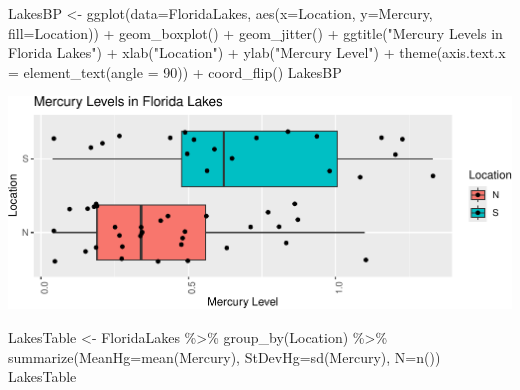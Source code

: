 \documentclass[
  letterpaper,
  DIV=11,
  numbers=noendperiod]{scrreprt}
\newenvironment{Shaded}{\begin{snugshade}}{\end{snugshade}}
\newcommand{\AttributeTok}[1]{\textcolor[rgb]{0.40,0.45,0.13}{#1}}
\newcommand{\DecValTok}[1]{\textcolor[rgb]{0.68,0.00,0.00}{#1}}
\newcommand{\FunctionTok}[1]{\textcolor[rgb]{0.28,0.35,0.67}{#1}}
\newcommand{\NormalTok}[1]{\textcolor[rgb]{0.00,0.23,0.31}{#1}}
\newcommand{\OtherTok}[1]{\textcolor[rgb]{0.00,0.23,0.31}{#1}}
\newcommand{\SpecialCharTok}[1]{\textcolor[rgb]{0.37,0.37,0.37}{#1}}
\newcommand{\StringTok}[1]{\textcolor[rgb]{0.13,0.47,0.30}{#1}}
\begin{document}
\begin{Shaded}
\begin{Highlighting}[]
\NormalTok{LakesBP }\OtherTok{\textless{}{-}} \FunctionTok{ggplot}\NormalTok{(}\AttributeTok{data=}\NormalTok{FloridaLakes, }\FunctionTok{aes}\NormalTok{(}\AttributeTok{x=}\NormalTok{Location, }\AttributeTok{y=}\NormalTok{Mercury, }\AttributeTok{fill=}\NormalTok{Location)) }\SpecialCharTok{+} 
  \FunctionTok{geom\_boxplot}\NormalTok{() }\SpecialCharTok{+}   \FunctionTok{geom\_jitter}\NormalTok{() }\SpecialCharTok{+} \FunctionTok{ggtitle}\NormalTok{(}\StringTok{"Mercury Levels in Florida Lakes"}\NormalTok{) }\SpecialCharTok{+} 
  \FunctionTok{xlab}\NormalTok{(}\StringTok{"Location"}\NormalTok{) }\SpecialCharTok{+} \FunctionTok{ylab}\NormalTok{(}\StringTok{"Mercury Level"}\NormalTok{) }\SpecialCharTok{+} \FunctionTok{theme}\NormalTok{(}\AttributeTok{axis.text.x =} \FunctionTok{element\_text}\NormalTok{(}\AttributeTok{angle =} \DecValTok{90}\NormalTok{)) }\SpecialCharTok{+} \FunctionTok{coord\_flip}\NormalTok{()}
\NormalTok{LakesBP}
\end{Highlighting}
\end{Shaded}

\includegraphics{Ch3_files/figure-pdf/unnamed-chunk-101-1.pdf}

\begin{Shaded}
\begin{Highlighting}[]
\NormalTok{LakesTable }\OtherTok{\textless{}{-}}\NormalTok{ FloridaLakes }\SpecialCharTok{\%\textgreater{}\%} \FunctionTok{group\_by}\NormalTok{(Location) }\SpecialCharTok{\%\textgreater{}\%} \FunctionTok{summarize}\NormalTok{(}\AttributeTok{MeanHg=}\FunctionTok{mean}\NormalTok{(Mercury), }
                                                  \AttributeTok{StDevHg=}\FunctionTok{sd}\NormalTok{(Mercury), }
                                                  \AttributeTok{N=}\FunctionTok{n}\NormalTok{())}
\NormalTok{LakesTable}
\end{Highlighting}
\end{Shaded}
\end{document}
